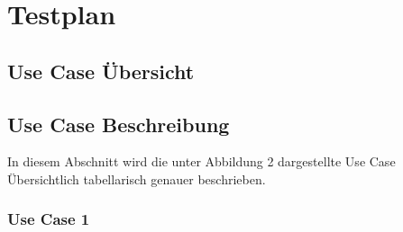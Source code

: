 \section{Testplan}
\subsection{Use Case Übersicht}



\subsection{Use Case Beschreibung}
In diesem Abschnitt wird die unter Abbildung 2 dargestellte Use Case Übersichtlich tabellarisch genauer beschrieben.


\subsubsection{Use Case 1}


